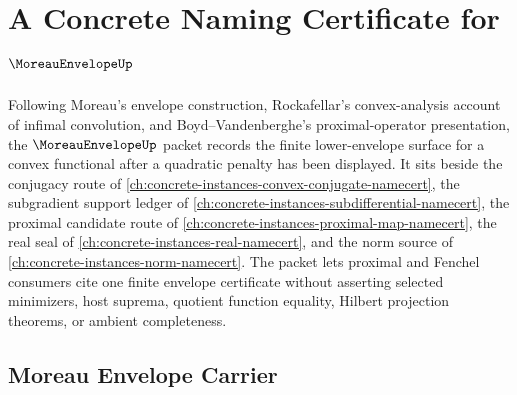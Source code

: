 \chapter{A Concrete Naming Certificate for $\MoreauEnvelopeUp$}
\label{ch:concrete-instances-moreau-envelope-namecert}

Following Moreau's envelope construction, Rockafellar's convex-analysis account of infimal convolution, and Boyd--Vandenberghe's proximal-operator presentation, the $\MoreauEnvelopeUp$ packet records the finite lower-envelope surface for a convex functional after a quadratic penalty has been displayed. It sits beside the conjugacy route of \autoref{ch:concrete-instances-convex-conjugate-namecert}, the subgradient support ledger of \autoref{ch:concrete-instances-subdifferential-namecert}, the proximal candidate route of \autoref{ch:concrete-instances-proximal-map-namecert}, the real seal of \autoref{ch:concrete-instances-real-namecert}, and the norm source of \autoref{ch:concrete-instances-norm-namecert}. The packet lets proximal and Fenchel consumers cite one finite envelope certificate without asserting selected minimizers, host suprema, quotient function equality, Hilbert projection theorems, or ambient completeness.

\section{Moreau Envelope Carrier}
\label{sec:moreau-envelope-carrier}

